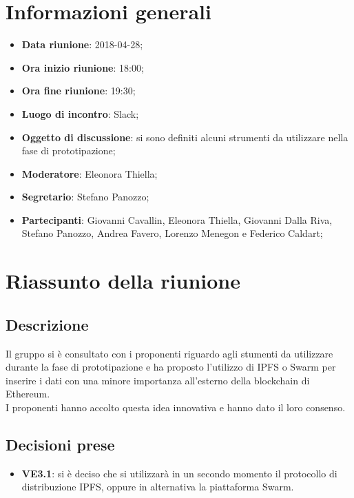 \section{Informazioni generali}
	\begin{itemize}
		\item \textbf{Data riunione}: 2018-04-28;
		\item \textbf{Ora inizio riunione}: 18:00;
		\item \textbf{Ora fine riunione}: 19:30;
		\item \textbf{Luogo di incontro}: Slack;
		\item \textbf{Oggetto di discussione}: si sono definiti alcuni strumenti da utilizzare nella fase di prototipazione;
		\item \textbf{Moderatore}: Eleonora Thiella;
		\item \textbf{Segretario}: Stefano Panozzo;
		\item \textbf{Partecipanti}: Giovanni Cavallin, Eleonora Thiella, Giovanni Dalla Riva, Stefano Panozzo, Andrea Favero, Lorenzo Menegon e Federico Caldart;
	\end{itemize}

\section{Riassunto della riunione}
	\subsection{Descrizione} Il gruppo si è consultato con i proponenti riguardo agli stumenti da utilizzare durante la fase di prototipazione e ha proposto l'utilizzo di IPFS o Swarm per inserire i dati con una minore importanza all'esterno della blockchain di Ethereum.
	\\I proponenti hanno accolto questa idea innovativa e hanno dato il loro consenso.
	
	\subsection{Decisioni prese}
		\begin{itemize}
			\item \textbf{VE3.1}: si è deciso che si utilizzarà in un secondo momento il protocollo di distribuzione IPFS, oppure in alternativa la piattaforma Swarm.
		\end{itemize}